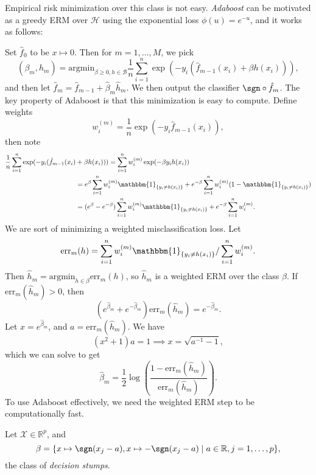 \documentclass[12pt]{article}
\begin{document}
Empirical risk minimization over this class is not easy. \emph{Adaboost} can be motivated as a greedy ERM over $\mathcal{H}$ using the exponential loss $\phi(u) = e^{-u}$, and it works as follows:

Set $\hat f_0$ to be $x \mapsto 0$. Then for $m = 1, \ldots, M$, we pick
\[
	(\beta_m, \hat h_m) = \mathrm{argmin}_{\beta \geq 0, h \in \mathcal{B}} \frac{1}{n} \sum_{i = 1}^n \exp (- y_i(\hat f_{m-1}(x_i) + \beta h(x_i))),
\]
and then let $\hat f_m = \hat f_{m-1} + \hat \beta_m \hat h_m$. We then output the classifier $\sgn \circ \hat f_m$. The key property of Adaboost is that this minimization is easy to compute. Define weights
\[
w_i^{(m)} = \frac{1}{n} \exp (-y_i \hat f_{m-1} (x_i)),
\]
then note
\begin{align*}
	\frac{1}{n} \sum_{i = 1}^n \exp(-y_i(\hat f_{m-1}(x_i) &+ \beta h(x_i))) = \sum_{i = 1}^n w_i^{(m)} \exp(- \beta y_i h(x_i)) \\
	&= e^{\beta} \sum_{i = 1}^n w_i^{(m)} \mathbbm{1}_{\{y_i \neq h(x_i)\}} + e^{-\beta} \sum_{i = 1}^n w_i^{(m)} (1 - \mathbbm{1}_{\{y_i \neq h(x_i)\}}) \\
	&= (e^\beta - e^{-\beta}) \sum_{i = 1}^n w_i^{(m)} \mathbbm{1}_{\{y_i \neq h(x_i)\}} + e^{-\beta} \sum_{i = 1}^n w_i^{(m)}.
\end{align*}
We are sort of minimizing a weighted misclassification loss. Let
\[
	\mathrm{err}_m(h) = \sum_{i = 1}^n w_i^{(m)} \mathbbm{1}_{\{y_i \neq h(x_i)\}} / \sum_{i = 1}^n w_i^{(m)}.
\]
Then $\hat h_m = \mathrm{argmin}_{h \in \beta} \mathrm{err}_m(h)$, so $\hat h_m$ is a weighted ERM over the class $\beta$. If $\mathrm{err}_m(\hat h_m) > 0$, then
\[
	(e^{\hat \beta_m} + e^{-\hat \beta_m}) \mathrm{err}_m(\hat h_m) = e^{- \hat \beta_m}.
\]
Let $x = e^{\hat \beta_m}$, and $a = \mathrm{err}_m(\hat h_m)$. We have
\[
	(x^2 + 1)a = 1 \implies x = \sqrt{a^{-1} - 1},
\]
which we can solve to get
\[
\hat \beta_m = \frac{1}{2} \log \left( \frac{1 - \mathrm{err}_m(\hat h_m)}{\mathrm{err}_m(\hat h_m)} \right).
\]
To use Adaboost effectively, we need the weighted ERM step to be computationally fast.

\begin{exbox}
	Let $\mathcal{X} \in \mathbb{R}^p$, and
	\[
		\beta = \{x \mapsto \sgn(x_j- a), x \mapsto - \sgn(x_j - a) \mid a \in \mathbb{R}, j = 1, \ldots, p\},
	\]
	the class of \emph{decision stumps}.
\end{exbox}


\printindex
\end{document}
